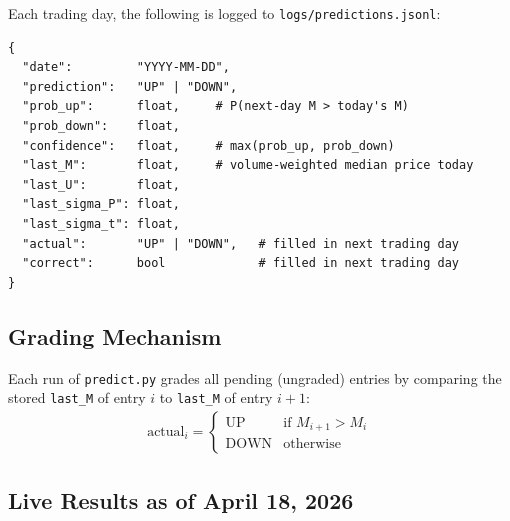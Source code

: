 \documentclass[11pt]{article}
\begin{document}
Each trading day, the following is logged to \texttt{logs/predictions.jsonl}:
\begin{lstlisting}
{
  "date":         "YYYY-MM-DD",
  "prediction":   "UP" | "DOWN",
  "prob_up":      float,     # P(next-day M > today's M)
  "prob_down":    float,
  "confidence":   float,     # max(prob_up, prob_down)
  "last_M":       float,     # volume-weighted median price today
  "last_U":       float,
  "last_sigma_P": float,
  "last_sigma_t": float,
  "actual":       "UP" | "DOWN",   # filled in next trading day
  "correct":      bool             # filled in next trading day
}
\end{lstlisting}

\subsection{Grading Mechanism}

Each run of \texttt{predict.py} grades all pending (ungraded) entries by comparing the stored \texttt{last\_M} of entry $i$ to \texttt{last\_M} of entry $i+1$:
\begin{align}
    \mathrm{actual}_i = \begin{cases} \mathrm{UP} & \text{if } M_{i+1} > M_i \\ \mathrm{DOWN} & \text{otherwise} \end{cases}
\end{align}

\subsection{Live Results as of April 18, 2026}

\begin{table}[htbp]
\centering
\caption{Full prediction log as of April 18, 2026}
\end{table}
\end{document}
